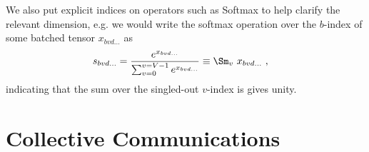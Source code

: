 \documentclass[11pt]{article}
\begin{document}
We also put explicit indices on operators such as Softmax to help clarify the relevant
dimension, e.g. we would write the softmax operation over the $ b $-index of some batched
tensor $ x _{ bvd\ldots } $ as
\begin{align}
	s _{ bvd\ldots } & = \frac{ e^{ x _{ bv d\ldots}  } }{ \sum _{ v = 0 } ^{  v= V-1 } e^{ x _{
						bvd\ldots } } } \equiv
	\Sm _{ v } \ x _{ bvd\ldots }
	\ , \label{app_eq_einstein_softmax}
\end{align}
indicating that the sum over the singled-out $ v $-index is gives unity.

\section{Collective Communications \label{app_collective_communications} }
\end{document}

